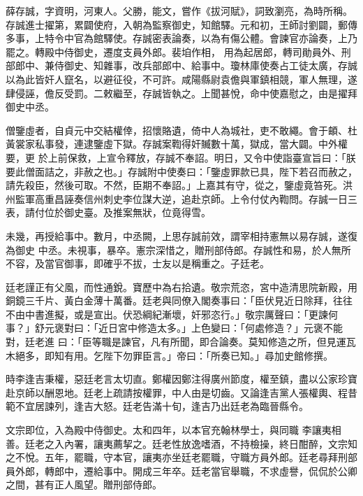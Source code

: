 \begin{pinyinscope}
 薛存誠，字資明，河東人。父勝，能文，嘗作《拔河賦》，詞致瀏亮，為時所稱。存誠進士擢第，累闢使府，入朝為監察御史，知館驛。元和初，王師討劉闢，郵傳多事，上特令中官為館驛使。存誠密表論奏，以為有傷公體。會諫官亦論奏，上乃罷之。轉殿中侍御史，遷度支員外郎。裴垍作相，
 用為起居郎，轉司勛員外、刑部郎中、兼侍御史、知雜事，改兵部郎中、給事中。瓊林庫使奏占工徒太廣，存誠以為此皆奸人竄名，以避征役，不可許。咸陽縣尉袁儋與軍鎮相競，軍人無理，遂肆侵誣，儋反受罰。二敕繼至，存誠皆執之。上聞甚悅，命中使嘉慰之，由是擢拜御史中丞。



 僧鑒虛者，自貞元中交結權倖，招懷賂遺，倚中人為城社，吏不敢繩。會于頔、杜黃裳家私事發，連逮鑒虛下獄。存誠案鞫得奸贓數十萬，獄成，當大闢。中外權要，更
 於上前保救，上宣令釋放，存誠不奉詔。明日，又令中使詣臺宣旨曰：「朕要此僧面詰之，非赦之也。」存誠附中使奏曰：「鑒虛罪款已具，陛下若召而赦之，請先殺臣，然後可取。不然，臣期不奉詔。」上嘉其有守，從之，鑒虛竟笞死。洪州監軍高重昌誣奏信州刺史李位謀大逆，追赴京師。上令付仗內鞫問。存誠一日三表，請付位於御史臺。及推案無狀，位竟得雪。



 未幾，再授給事中。數月，中丞闕，上思存誠前效，謂宰相持憲無以易存誠，遂復為御史
 中丞。未視事，暴卒。憲宗深惜之，贈刑部侍郎。存誠性和易，於人無所不容，及當官御事，即確乎不拔，士友以是稱重之。子廷老。



 廷老謹正有父風，而性通銳。寶歷中為右拾遺。敬宗荒恣，宮中造清思院新殿，用銅鏡三千片、黃白金薄十萬番。廷老與同僚入閣奏事曰：「臣伏見近日除拜，往往不由中書進擬，或是宣出。伏恐綱紀漸壞，奸邪恣行。」敬宗厲聲曰：「更諫何事？」舒元褒對曰：「近日宮中修造太多。」上色變曰：「何處修造？」元褒不能對，廷老進
 曰：「臣等職是諫官，凡有所聞，即合論奏。莫知修造之所，但見運瓦木絕多，即知有用。乞陛下勿罪臣言。」帝曰：「所奏已知。」尋加史館修撰。



 時李逢吉秉權，惡廷老言太切直。鄭權因鄭注得廣州節度，權至鎮，盡以公家珍寶赴京師以酬恩地。廷老上疏請按權罪，中人由是切齒。又論逢吉黨人張權輿、程昔範不宜居諫列，逢吉大怒。廷老告滿十旬，逢吉乃出廷老為臨晉縣令。



 文宗即位，入為殿中侍御史。太和四年，以本官充翰林學士，與同職
 李讓夷相善。廷老之入內署，讓夷薦挈之。廷老性放逸嗜酒，不持檢操，終日酣醉，文宗知之不悅。五年，罷職，守本官，讓夷亦坐廷老罷職，守職方員外郎。廷老尋拜刑部員外郎，轉郎中，遷給事中。開成三年卒。廷老當官舉職，不求虛譽，侃侃於公卿之間，甚有正人風望。贈刑部侍郎。




\end{pinyinscope}
